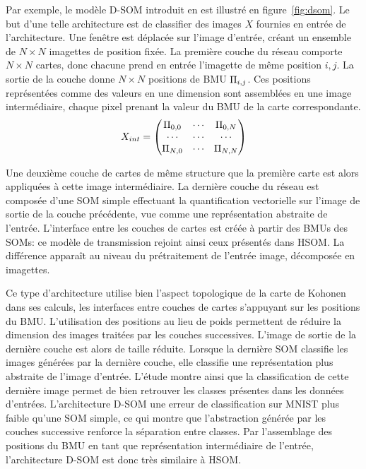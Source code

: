 \documentclass[../main]{subfiles}
\begin{document}
Par exemple, le modèle D-SOM introduit en \cite{liu_deep_2015,wickramasinghe_deep_2019} est illustré en figure~\ref{fig:dsom}.
Le but d'une telle architecture est de classifier des images $X$ fournies en entrée de l'architecture.
Une fenêtre est déplacée sur l'image d'entrée, créant un ensemble de $N\times N$ imagettes de position fixée. La première couche du réseau comporte $N \times N$ cartes, donc chacune prend en entrée l'imagette de même position $i,j$.
La sortie de la couche donne $N  \times N$ positions de BMU $\Pi_{i,j}$.
Ces positions représentées comme des valeurs en une dimension sont assemblées en une image intermédiaire, chaque pixel prenant la valeur du BMU de la carte correspondante.
    $$X_{int} = \begin{pmatrix}
    \Pi_{0,0}  &  \cdots & \Pi_{0,N} \\
    \cdots & \cdots & \cdots \\
    \Pi_{N,0} & \cdots & \Pi_{N,N}
    \end{pmatrix} $$

Une deuxième couche de cartes de même structure que la première carte est alors appliquées à cette image intermédiaire. La dernière couche du réseau est composée d'une SOM simple effectuant la quantification vectorielle sur l'image de sortie de la couche précédente, vue comme une représentation abstraite  de l'entrée.
L'interface entre les couches de cartes est créée à partir des BMUs des SOMs: ce modèle de transmission rejoint ainsi ceux présentés dans HSOM. La différence apparaît au niveau du prétraitement de l'entrée image, décomposée en imagettes.

Ce type d'architecture utilise bien l'aspect topologique de la carte de Kohonen dans ses calculs, les interfaces entre couches de cartes s'appuyant sur les positions du BMU. L'utilisation des positions au lieu de poids permettent de réduire la dimension des images traitées par les couches successives. L'image de sortie de la dernière couche est alors de taille réduite. Lorsque la dernière SOM classifie les images générées par la dernière couche, elle classifie une représentation plus abstraite de l'image d'entrée. L'étude montre ainsi que la classification de cette dernière image permet de bien retrouver les classes présentes dans les données d'entrées. L'architecture D-SOM une erreur de classification sur MNIST plus faible qu'une SOM simple, ce qui montre que l'abstraction générée par les couches successive renforce la séparation entre classes.
Par l'assemblage des positions du BMU en tant que représentation intermédiaire de l'entrée, l'architecture D-SOM est donc très similaire à HSOM.
\end{document}
